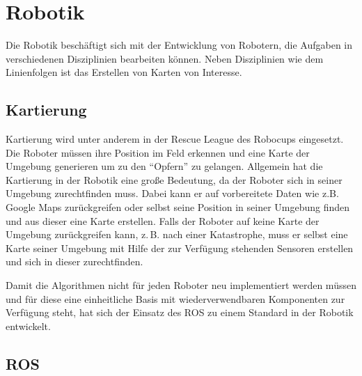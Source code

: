 \chapter{Robotik} %
\label{cha:robotik}

Die Robotik beschäftigt sich mit der Entwicklung von Robotern, die Aufgaben in verschiedenen Disziplinien bearbeiten können. Neben Disziplinien wie dem Li\-nien\-folgen ist das Erstellen von Karten von Interesse.

\section{Kartierung} %
\label{sec:kartierung}

Kartierung wird unter anderem in der Rescue League des Robocups eingesetzt. Die Roboter müssen ihre Position im Feld erkennen und eine Karte der Umgebung generieren um zu den \enquote{Opfern} zu gelangen. Allgemein hat die Kartierung in der Robotik eine große Bedeutung, da der Roboter sich in seiner Umgebung zurechtfinden muss. Dabei kann er auf vorbereitete Daten wie z.B. Google Maps zurückgreifen oder selbst seine Position in seiner Umgebung finden und aus dieser eine Karte erstellen. Falls der Roboter auf keine Karte der Umgebung zurückgreifen kann, z.\,B. nach einer Katastrophe, muss er selbst eine Karte seiner Umgebung mit Hilfe der zur Verfügung stehenden Sensoren erstellen und sich in dieser zurechtfinden.\par
Damit die Algorithmen nicht für jeden Roboter neu implementiert werden müssen und für diese eine einheitliche Basis mit wiederverwendbaren Komponenten zur Verfügung steht, hat sich der Einsatz des \ac{ROS} zu einem Standard in der Robotik entwickelt.


\section{ROS} %
\label{sec:ros}

